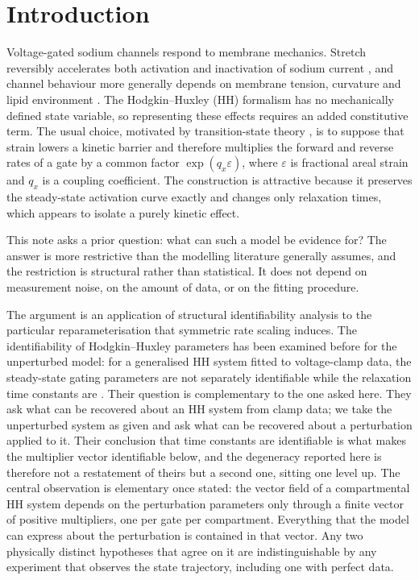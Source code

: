 \section{Introduction}

Voltage-gated sodium channels respond to membrane mechanics. Stretch reversibly
accelerates both activation and inactivation of sodium current
\citep{morris2007}, and channel behaviour more generally depends on membrane
tension, curvature and lipid environment \citep{coste2010,murthy2017,sukharev2012}.
The Hodgkin--Huxley (HH) formalism \citep{hodgkin1952} has no mechanically
defined state variable, so representing these effects requires an added
constitutive term. The usual choice, motivated by transition-state theory
\citep{eyring1935}, is to suppose that strain lowers a kinetic barrier and
therefore multiplies the forward and reverse rates of a gate by a common factor
$\exp(q_x\varepsilon)$, where $\varepsilon$ is fractional areal strain and $q_x$
is a coupling coefficient. The construction is attractive because it preserves
the steady-state activation curve exactly and changes only relaxation times,
which appears to isolate a purely kinetic effect.

This note asks a prior question: what can such a model be evidence for? The
answer is more restrictive than the modelling literature generally assumes, and
the restriction is structural rather than statistical. It does not depend on
measurement noise, on the amount of data, or on the fitting procedure.

The argument is an application of structural identifiability analysis
\citep{bellman1970,cobelli1980,chis2011} to the particular reparameterisation
that symmetric rate scaling induces. The identifiability of Hodgkin--Huxley
parameters has been examined before for the unperturbed model: for a generalised HH system
fitted to voltage-clamp data, the steady-state gating parameters are not
separately identifiable while the relaxation time constants are
\citep{walch2016}. Their question is complementary to the one asked here. They ask what can be
recovered about an HH system from clamp data; we take the unperturbed system as
given and ask what can be recovered about a perturbation applied to it. Their
conclusion that time constants are identifiable is what makes the multiplier
vector identifiable below, and the degeneracy reported here is therefore not a
restatement of theirs but a second one, sitting one level up. The central observation is elementary once
stated: the vector field of a compartmental HH system depends on the
perturbation parameters only through a finite vector of positive multipliers,
one per gate per compartment. Everything that the model can express about the
perturbation is contained in that vector. Any two physically distinct
hypotheses that agree on it are indistinguishable by any experiment that
observes the state trajectory, including one with perfect data.

